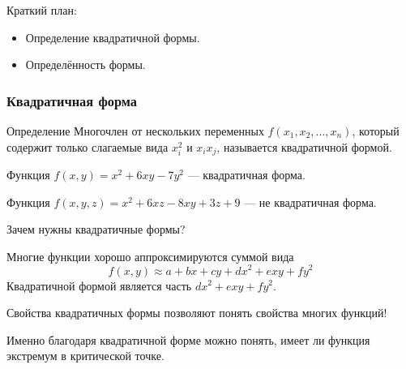 
\begin{frame} %


\end{frame}



\begin{frame}{Краткий план:}
  \begin{itemize}[<+->]
    \item Определение квадратичной формы.
    \item Определённость формы.
  \end{itemize}

\end{frame}



\begin{frame}
    \frametitle{Квадратичная форма}    

    \begin{block}{Определение}
       Многочлен от нескольких переменных $f(x_1, x_2, \ldots, x_n)$, который содержит только слагаемые вида $x_i^2$ и $x_i x_j$,
       называется \alert{квадратичной формой}.
    \end{block}

    \pause
    Функция $f(x,y) = x^2 + 6xy - 7y^2$ — квадратичная форма.

    \pause
    Функция $f(x, y, z) = x^2 + 6xz - 8xy + 3z + 9$ — не квадратичная форма. 
\end{frame}


\begin{frame}{Зачем нужны квадратичные формы?}
    
    Многие функции хорошо аппроксимируются суммой вида
    \[
    f(x, y) \approx a + b x + c y + d x^2 + e xy + f y^2 
    \]
    Квадратичной формой является часть $d x^2 + e xy + f y^2$. \pause


    Свойства квадратичных формы позволяют понять свойства многих функций! \pause

    Именно благодаря квадратичной форме можно понять, 
    имеет ли функция экстремум в критической точке. 
    
\end{frame}


